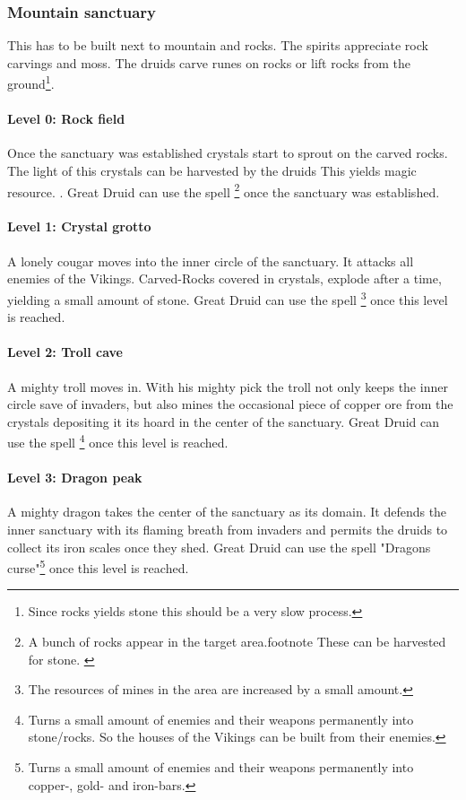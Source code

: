 \documentclass[a4paper]{book}
\begin{document}
		\subsubsection{Mountain sanctuary}
			This has to be built next to mountain and rocks.
			The spirits appreciate rock carvings and moss.
			The druids carve runes on rocks or lift rocks from the ground\footnote{
				Since rocks yields stone this should be a very slow process.
			}.

			\paragraph{Level 0: Rock field}
				Once the sanctuary was established crystals start to sprout on the carved rocks.
				The light of this crystals can be harvested by the druids{
					This yields magic resource.
				}.
				Great Druid can use the spell \footnote{
					A bunch of rocks appear in the target area.footnote{
						These can be harvested for stone.
					}
				} once the sanctuary was established.

			\paragraph{Level 1: Crystal grotto}
				A lonely cougar moves into the inner circle of the sanctuary.
				It attacks all enemies of the \gls{Vikings}.
				Carved-Rocks covered in crystals, explode after a time,
				yielding a small amount of stone.
				Great Druid can use the spell \footnote{
					The resources of mines in the area are increased by a small amount.
				} once this level is reached.

			\paragraph{Level 2: Troll cave}
				A mighty troll moves in.
				With his mighty pick the troll not only keeps the inner circle save of invaders,
				but also mines the occasional piece of copper ore from the crystals depositing it its hoard
				in the center of the sanctuary.
				Great Druid can use the spell \footnote{
					Turns a small amount of enemies and their weapons permanently into stone/rocks.
					So the houses of the \gls{Vikings} can be built from their enemies.
				} once this level is reached.

			\paragraph{Level 3: Dragon peak}
				A mighty dragon takes the center of the sanctuary as its domain.
				It defends the inner sanctuary with its flaming breath from invaders
				and permits the druids to collect its iron scales once they shed.
				Great Druid can use the spell "Dragons curse"\footnote{
					Turns a small amount of enemies and their weapons permanently into copper-, gold- and iron-bars.
				} once this level is reached.
\end{document}
